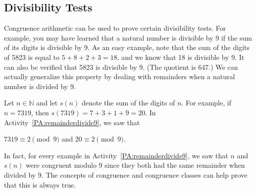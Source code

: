\subsection*{Divisibility Tests}
Congruence arithmetic can be used to prove certain divisibility tests.  For example, you may have learned that a natural number is divisible by 9 if the sum of its digits is divisible by 9.  As an easy example, note that the sum of the digits of 5823 is equal to $5 + 8 + 2 + 3 = 18$, and we know that 18 is divisible by 9.  It can also be verified that 5823 is divisible by 9. (The quotient is 647.)  We can actually generalize this property by dealing with remainders when a natural number is divided by 9.

Let  $n \in \mathbb{N}$ and let  $s( n )$  denote the sum of the digits of  $n$.  For example,  if  $n = 7319$, then $s( {7319} ) = 7 + 3 + 1 + 9 = 20$.  In \typeu 
Activity~\ref*{PA:remainderdivide9}, we saw that
\begin{center}
$7319 \equiv 2 \pmod 9$ and  $20 \equiv 2 \pmod 9$.
\end{center}
In fact, for every example in \typeu Activity~\ref*{PA:remainderdivide9}, we saw that  $n$  and   $s( n )$ were congruent modulo 9 since they both had the same remainder when divided by  9.  The concepts of congruence and congruence classes can help prove that this is always true.
 
